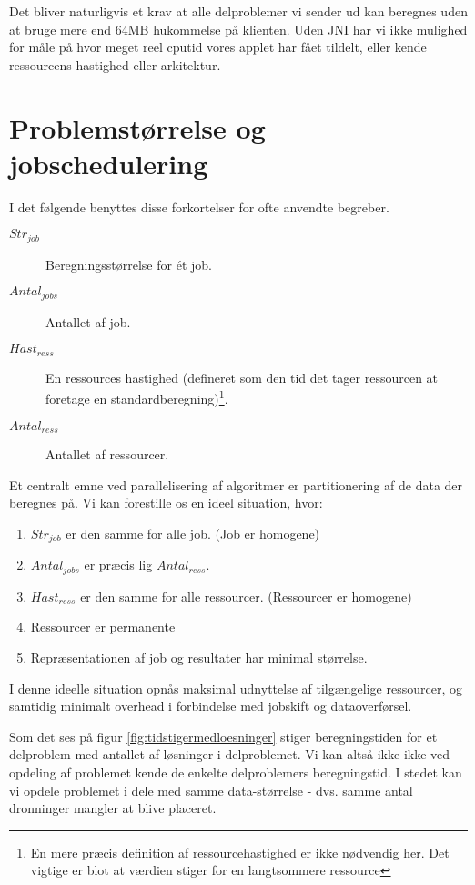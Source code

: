 \documentclass[pdf,draft,a4paper,11pt]{article}
\begin{document}
Det bliver naturligvis et krav at alle delproblemer vi sender ud kan beregnes uden at bruge mere end 64MB hukommelse på klienten. Uden JNI har vi ikke mulighed for måle på hvor meget reel cputid vores applet har fået tildelt, eller kende ressourcens hastighed eller arkitektur.   


\section{Problemstørrelse og jobschedulering}\label{opdelingogschedulering}

I det følgende benyttes disse forkortelser for ofte anvendte begreber.
\begin{description}
	\item[$Str_{job}$] Beregningsstørrelse for ét job.
	\item[$Antal_{jobs}$] Antallet af job.
	\item[$Hast_{ress}$] En ressources hastighed (defineret som den tid det tager ressourcen at foretage en standardberegning)\footnote{En mere præcis definition af ressourcehastighed er ikke nødvendig her. Det vigtige er blot at værdien stiger for en langtsommere ressource}.
	\item[$Antal_{ress}$] Antallet af ressourcer.  
\end{description}
Et centralt emne ved parallelisering af algoritmer er partitionering af de data der beregnes på. Vi kan forestille os en ideel situation, hvor:
\begin{enumerate}
	\item $Str_{job}$ er den samme for alle job. (Job er homogene) \label{beregningstid}
	\item $Antal_{jobs}$ er præcis lig $Antal_{ress}$.\label{antal}
	\item $Hast_{ress}$ er den samme for alle ressourcer. (Ressourcer er homogene) 
	\item Ressourcer er permanente
	\item Repræsentationen af job og resultater har minimal størrelse.\label{jobbeskrivelse}
\end{enumerate}

I denne ideelle situation opnås maksimal udnyttelse af tilgængelige ressourcer, og samtidig minimalt overhead i forbindelse med jobskift og dataoverførsel.
 
Som det ses på figur \ref{fig:tidstigermedloesninger} stiger beregningstiden for et delproblem med antallet af løsninger i delproblemet. Vi kan altså ikke ikke ved opdeling af problemet kende de enkelte delproblemers beregningstid. I stedet kan vi opdele problemet i dele med samme data-størrelse - dvs. samme antal dronninger mangler at blive placeret. 
\end{document}
